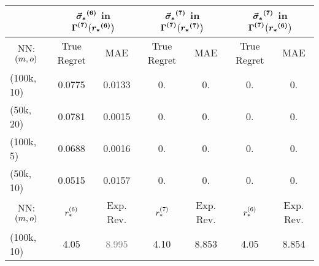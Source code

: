\begin{table}[htbp]
\centering
\begin{tabular}{l|cc|cc|cc|}
& \multicolumn{2}{c|}{$\boldsymbol{\vec{\sigma}_*}^{\textbf{(6)}}$ in $\mathbf{\boldsymbol{\Gamma}^{\textbf{(7)}}\bigl(\boldsymbol{r_*}^{\textbf{(6)}}\bigr)}$}
& \multicolumn{2}{c|}{$\boldsymbol{\vec{\sigma}_*}^{\textbf{(7)}}$ in $\mathbf{\boldsymbol{\Gamma}^{\textbf{(7)}}\bigl(\boldsymbol{r_*}^{\textbf{(7)}}\bigr)}$}
& \multicolumn{2}{c|}{$\boldsymbol{\vec{\sigma}_*}^{\textbf{(7)}}$ in $\mathbf{\boldsymbol{\Gamma}^{\textbf{(7)}}\bigl(\boldsymbol{r_*}^{\textbf{(6)}}\bigr)}$} \\
 
\hline
\multicolumn{1}{c|}{NN: $(m, o)$}
 & \multicolumn{1}{c}{True Regret} & \multicolumn{1}{c|}{MAE}
 & \multicolumn{1}{c}{True Regret} & \multicolumn{1}{c|}{MAE}
 & \multicolumn{1}{c}{True Regret} & \multicolumn{1}{c|}{MAE} \\
\hline
(100k, 10) & 0.0775 & 0.0133 & 0. & 0. & 0. & 0. \\
(50k, 20)  & 0.0781 & 0.0015 & 0. & 0. & 0. & 0. \\
(100k, 5)  & 0.0688 & 0.0016 & 0. & 0. & 0. & 0. \\
(50k, 10)  & 0.0515 & 0.0157 & 0. & 0. & 0. & 0. \\
\hline 
\hline
\multicolumn{1}{c|}{\rule{0pt}{12pt} NN: $(m, o)$}
 & \multicolumn{1}{c}{\rule{0pt}{12pt} $r_*^{(6)}$} & \multicolumn{1}{c|}{\rule{0pt}{12pt} Exp. Rev.}
 & \multicolumn{1}{c}{\rule{0pt}{12pt} $r_*^{(7)}$} & \multicolumn{1}{c|}{\rule{0pt}{12pt} Exp. Rev.}
 & \multicolumn{1}{c}{\rule{0pt}{12pt} $r_*^{(6)}$} & \multicolumn{1}{c|}{\rule{0pt}{12pt} Exp. Rev.} \\
\hline
(100k, 10) & 4.05 & \textcolor{gray}{8.995} & 4.10  & 8.853 & 4.05 & 8.854 \\

\end{tabular}
\end{table}

